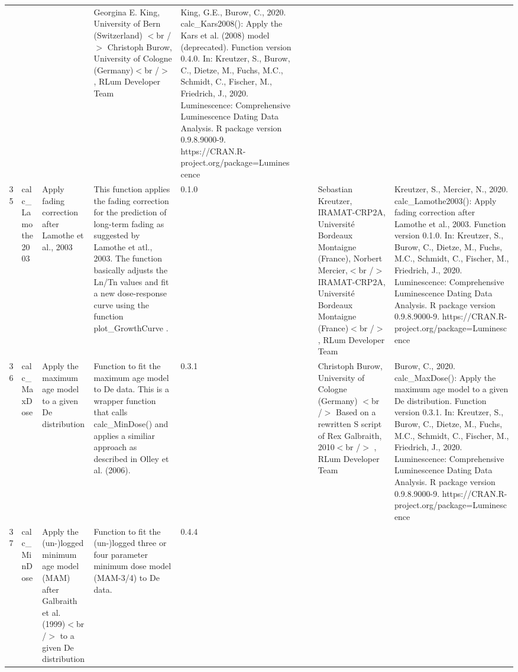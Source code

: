 \begin{table}[ht]
\begin{tabular}{rllllllll}
 &  &  & Georgina E. King, University of Bern (Switzerland)  $<$br /$>$ Christoph Burow, University of Cologne (Germany)$<$br /$>$ , RLum Developer Team & King, G.E., Burow, C., 2020. calc\_Kars2008(): Apply the Kars et al. (2008) model (deprecated). Function version 0.4.0. In: Kreutzer, S., Burow, C., Dietze, M., Fuchs, M.C., Schmidt, C., Fischer, M., Friedrich, J., 2020. Luminescence: Comprehensive Luminescence Dating Data Analysis. R package version 0.9.8.9000-9. https://CRAN.R-project.org/package=Luminescence
 \\ 
  35 & calc\_Lamothe2003 & Apply fading correction after Lamothe et al., 2003 & This function applies the fading correction for the prediction of long-term fading as suggested by Lamothe et atl., 2003. The function basically adjusts the Ln/Tn values and fit a new dose-response curve using the function  plot\_GrowthCurve . & 0.1.0
 &  &  & Sebastian Kreutzer, IRAMAT-CRP2A, Université Bordeaux Montaigne (France), Norbert Mercier,$<$br /$>$ IRAMAT-CRP2A, Université Bordeaux Montaigne (France)$<$br /$>$ , RLum Developer Team & Kreutzer, S., Mercier, N., 2020. calc\_Lamothe2003(): Apply fading correction after Lamothe et al., 2003. Function version 0.1.0. In: Kreutzer, S., Burow, C., Dietze, M., Fuchs, M.C., Schmidt, C., Fischer, M., Friedrich, J., 2020. Luminescence: Comprehensive Luminescence Dating Data Analysis. R package version 0.9.8.9000-9. https://CRAN.R-project.org/package=Luminescence
 \\ 
  36 & calc\_MaxDose & Apply the maximum age model to a given De distribution & Function to fit the maximum age model to De data. This is a wrapper function that calls calc\_MinDose() and applies a similiar approach as described in Olley et al. (2006). & 0.3.1
 &  &  & Christoph Burow, University of Cologne (Germany)  $<$br /$>$ Based on a rewritten S script of Rex Galbraith, 2010$<$br /$>$ , RLum Developer Team & Burow, C., 2020. calc\_MaxDose(): Apply the maximum age model to a given De distribution. Function version 0.3.1. In: Kreutzer, S., Burow, C., Dietze, M., Fuchs, M.C., Schmidt, C., Fischer, M., Friedrich, J., 2020. Luminescence: Comprehensive Luminescence Dating Data Analysis. R package version 0.9.8.9000-9. https://CRAN.R-project.org/package=Luminescence
 \\ 
  37 & calc\_MinDose & Apply the (un-)logged minimum age model (MAM) after Galbraith et al. (1999)$<$br /$>$ to a given De distribution & Function to fit the (un-)logged three or four parameter minimum dose model (MAM-3/4) to De data. & 0.4.4

\end{tabular}
\end{table}
